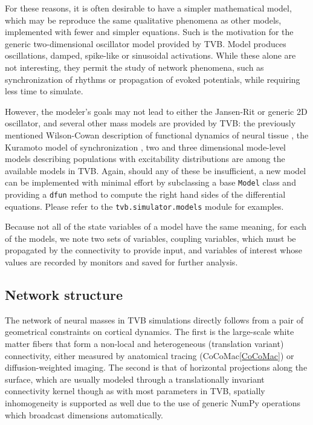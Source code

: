 	For these reasons, it is often desirable to have a simpler mathematical 
	model, which may be reproduce the same qualitative phenomena as other 
	models, implemented with fewer and simpler equations. Such is the motivation
	for the generic two-dimensional oscillator model provided by TVB. 
	Model produces oscillations, damped, spike-like or 
	sinusoidal activations. While these alone are not interesting, they 
	permit the study of network phenomena, such as synchronization of rhythms
	or propagation of evoked potentials, while requiring less time to simulate.

	However, the modeler's goals may not lead to either the Jansen-Rit or 
	generic 2D oscillator, and several other mass models are provided by TVB:
	the previously mentioned Wilson-Cowan description of functional dynamics of
	neural tissue \cite{Wilson_1972}, the Kuramoto model of synchronization \cite{Kuramoto1975}, two and 
	three dimensional mode-level models describing populations with 
	excitability distributions \cite{Stefanescu_2011, Stefanescu_2008} are
	among the available models in TVB.  
	Again, should any of these be insufficient, a new model can be implemented
	with minimal effort by subclassing a base \texttt{Model} class and providing a 
	\texttt{dfun} method to compute the right hand sides of the differential 
	equations. Please refer to the \texttt{tvb.simulator.models} module for 
	examples.

	Because not all of the state variables of a model have the same meaning,
	for each of the models, we note two sets of variables, 
	coupling variables, which must be propagated by the connectivity to 
	provide input, and variables of interest whose values are recorded by
	monitors and saved for further analysis. 

\subsection{Network structure}

	The network of neural masses in TVB simulations directly follows from 
	a pair of 
	geometrical constraints on cortical dynamics. The first is the 
	large-scale white matter fibers that form a non-local and heterogeneous
	(translation variant) connectivity, either measured by anatomical
	tracing (CoCoMac\ref{CoCoMac}) or diffusion-weighted imaging. The second
	is that of horizontal projections along the surface, which are 
	usually modeled through a translationally invariant connectivity kernel
	though as with most parameters in TVB, spatially inhomogeneity
	is supported as well due to the use of generic NumPy operations which
	broadcast dimensions automatically. 

